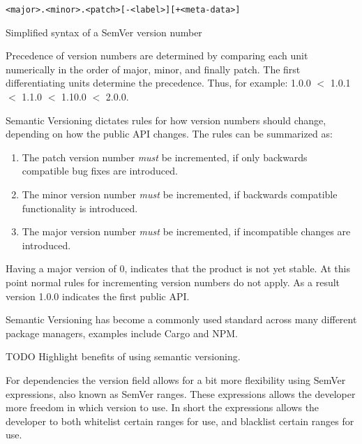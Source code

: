 \begin{listing}[H]
\begin{verbatim}
<major>.<minor>.<patch>[-<label>][+<meta-data>]
\end{verbatim}
\caption{Simplified syntax of a SemVer version number}
\label{lst:semver_syntax}
\end{listing}

Precedence of version numbers are determined by comparing each unit numerically
in the order of major, minor, and finally patch. The first differentiating
units determine the precedence. Thus, for example: 1.0.0 $<$ 1.0.1 $<$ 1.1.0
$<$ 1.10.0 $<$ 2.0.0.

Semantic Versioning dictates rules for how version numbers should change,
depending on how the public API changes. The rules can be summarized as:

\begin{enumerate}

    \item The patch version number \emph{must} be incremented, if only
        backwards compatible bug fixes are introduced.

    \item The minor version number \emph{must} be incremented, if backwards
        compatible functionality is introduced.

    \item The major version number \emph{must} be incremented, if incompatible
        changes are introduced.

\end{enumerate}

Having a major version of 0, indicates that the product is not yet stable. At
this point normal rules for incrementing version numbers do not apply. As a
result version 1.0.0 indicates the first public API.

Semantic Versioning has become a commonly used standard across many different
package managers, examples include
Cargo\autocite{CRAA} and NPM\autocite{NPMA}.

TODO Highlight benefits of using semantic versioning.


For dependencies the version field allows for a bit more flexibility using
SemVer expressions, also known as SemVer ranges\autocite{NPMB}. These
expressions allows the developer more freedom in which version to use. In short
the expressions allows the developer to both whitelist certain ranges for use,
    and blacklist certain ranges for use.

